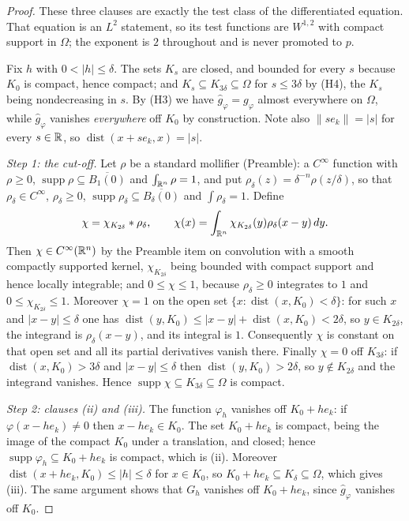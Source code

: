 \begin{proof}
These three clauses are exactly the test class of the differentiated equation.
That equation is an $L^2$ statement, so its test functions are $W^{1,2}$ with
compact support in $\Omega$; the exponent is $2$ throughout and is never
promoted to $p$.

Fix $h$ with $0<|h|\le\delta$.  The sets $K_s$ are closed, and bounded for
every $s$ because $K_0$ is compact, hence compact; and $K_s\subseteq
K_{3\delta}\subseteq\Omega$ for $s\le3\delta$ by (H4), the $K_s$ being
nondecreasing in $s$.  By (H3) we have $\widehat g_\varphi=g_\varphi$ almost
everywhere on $\Omega$, while $\widehat g_\varphi$ vanishes \emph{everywhere}
off $K_0$ by construction.  Note also
$\|se_k\|=|s|$ for every $s\in\mathbb{R}$, so
$\operatorname{dist}(x+se_k,x)=|s|$.

\emph{Step 1: the cut-off.}  Let $\rho$ be a standard mollifier (Preamble): a
$C^\infty$ function with $\rho\ge0$,
$\operatorname{supp}\rho\subseteq\overline{B_1(0)}$ and $\int_{\mathbb{R}^n}\rho=1$, and
put $\rho_\delta(z)=\delta^{-n}\rho(z/\delta)$, so that
$\rho_\delta\in C^\infty$, $\rho_\delta\ge0$,
$\operatorname{supp}\rho_\delta\subseteq\overline{B_\delta(0)}$ and
$\int\rho_\delta=1$.  Define
\[
\chi=\chi_{K_{2\delta}}*\rho_\delta,
\qquad
\chi(x)=\int_{\mathbb{R}^n}\chi_{K_{2\delta}}(y)\rho_\delta(x-y)\,dy .
\]
Then $\chi\in C^\infty(\mathbb{R}^n)$ by the Preamble item on convolution with a smooth
compactly supported kernel, $\chi_{K_{2\delta}}$ being bounded with compact
support and hence locally integrable; and $0\le\chi\le1$, because
$\rho_\delta\ge0$ integrates to $1$ and $0\le\chi_{K_{2\delta}}\le1$.
Moreover $\chi=1$ on the open set $\{x:\operatorname{dist}(x,K_0)<\delta\}$:
for such $x$ and $|x-y|\le\delta$ one has
$\operatorname{dist}(y,K_0)\le|x-y|+\operatorname{dist}(x,K_0)<2\delta$, so
$y\in K_{2\delta}$, the integrand is $\rho_\delta(x-y)$, and its integral is
$1$.  Consequently $\chi$ is constant on that open set and all its partial
derivatives vanish there.  Finally $\chi=0$ off $K_{3\delta}$: if
$\operatorname{dist}(x,K_0)>3\delta$ and $|x-y|\le\delta$ then
$\operatorname{dist}(y,K_0)>2\delta$, so $y\notin K_{2\delta}$ and the integrand
vanishes.  Hence $\operatorname{supp}\chi\subseteq K_{3\delta}\subseteq\Omega$
is compact.

\emph{Step 2: clauses (ii) and (iii).}  The function $\varphi_h$ vanishes off
$K_0+he_k$: if $\varphi(x-he_k)\ne0$ then $x-he_k\in K_0$.  The set $K_0+he_k$
is compact, being the image of the compact $K_0$ under a translation, and
closed; hence $\operatorname{supp}\varphi_h\subseteq K_0+he_k$ is compact, which
is (ii).  Moreover $\operatorname{dist}(x+he_k,K_0)\le|h|\le\delta$ for
$x\in K_0$, so $K_0+he_k\subseteq K_\delta\subseteq\Omega$, which gives (iii).
The same argument shows that $G_h$ vanishes off $K_0+he_k$, since
$\widehat g_\varphi$ vanishes off $K_0$.


\end{proof}
